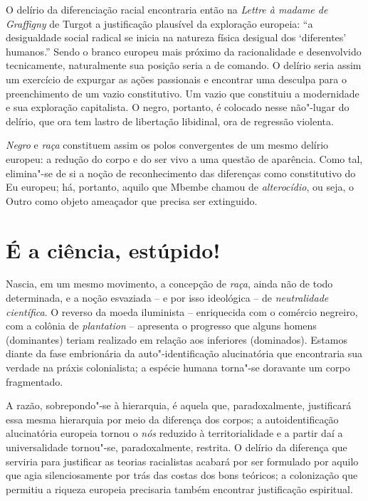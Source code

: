 O delírio da diferenciação racial encontraria então na \emph{Lettre à
madame de Graffigny} de Turgot a justificação plausível da exploração
europeia: ``a desigualdade social radical se inicia na natureza física desigual dos `diferentes'
humanos.'' Sendo o branco europeu mais próximo da
racionalidade e desenvolvido tecnicamente, naturalmente sua posição
seria a de comando. O delírio seria assim um exercício de expurgar as
ações passionais e encontrar uma desculpa para o preenchimento de um
vazio constitutivo. Um vazio que constituiu a modernidade e sua
exploração capitalista. O negro, portanto, é colocado nesse não"-lugar do
delírio, que ora tem lastro de libertação libidinal, ora de regressão
violenta.

\emph{Negro} e \emph{raça} constituem assim os polos convergentes de um
mesmo delírio europeu: a redução do corpo e do ser vivo a uma questão de
aparência. Como tal, elimina"-se de si a noção de reconhecimento das
diferenças como constitutivo do Eu europeu; há, portanto, aquilo que
Mbembe chamou de \emph{alterocídio}, ou seja, o Outro como objeto
ameaçador que precisa ser extinguido.

\chapter{É a ciência, estúpido!}

Nascia, em um mesmo movimento, a concepção de \emph{raça}, ainda não de
todo determinada, e a noção esvaziada -- e por isso ideológica -- de
\emph{neutralidade científica}. O reverso da moeda iluminista --
enriquecida com o comércio negreiro, com a colônia de \emph{plantation}
-- apresenta o progresso que alguns homens (dominantes) teriam realizado
em relação aos inferiores (dominados). Estamos diante da fase
embrionária da auto"-identificação alucinatória que encontraria sua
verdade na práxis colonialista; a espécie humana torna"-se doravante um
corpo fragmentado.

A razão, sobrepondo"-se à hierarquia, é aquela que, paradoxalmente,
justificará essa mesma hierarquia por meio da diferença dos corpos; a
autoidentificação alucinatória europeia tornou o \emph{nós} reduzido à
territorialidade e a partir daí a universalidade tornou"-se,
paradoxalmente, restrita. O delírio da diferença que serviria para
justificar as teorias racialistas acabará por ser formulado por aquilo
que agia silenciosamente por trás das costas dos bons teóricos; a
colonização que permitiu a riqueza europeia precisaria também encontrar
justificação espiritual.

